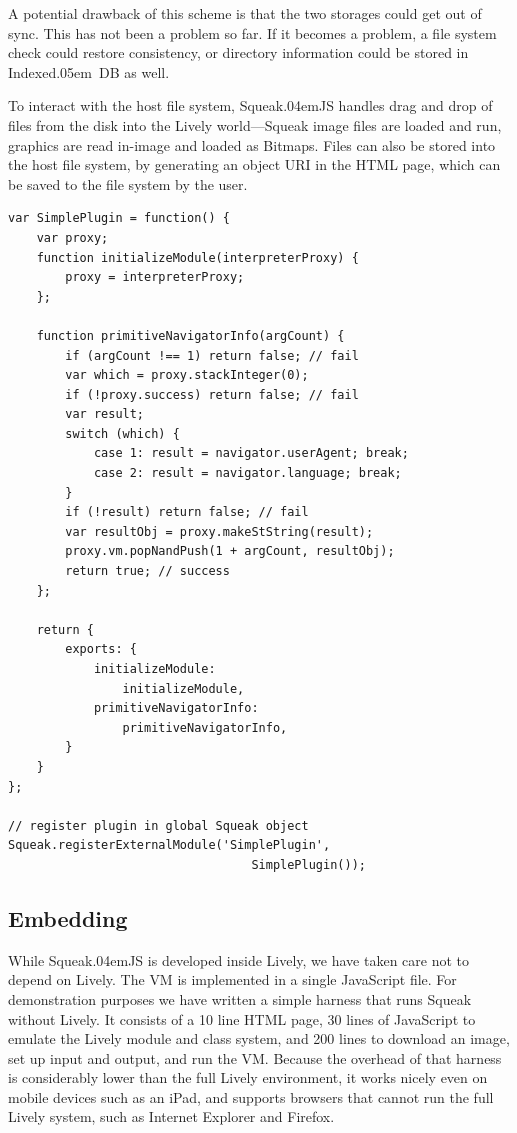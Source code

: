 \documentclass[natbib]{sigplanconf}
\newcommand*\SqueakJS{Squeak\texorpdfstring{\kern.04em}{}JS\xspace}
\newcommand*\JS{JavaScript\xspace}
\newcommand*\IndexedDB{\mbox{Indexed\kern.05em DB}\xspace}
\begin{document}
A potential drawback of this scheme is that the two storages could get
out of sync. This has not been a problem so far. If it becomes a
problem, a file system check could restore consistency, or directory
information could be stored in \IndexedDB as well.

To interact with the host file system, \SqueakJS handles drag and drop
of files from the disk into the Lively world---Squeak image files are
loaded and run, graphics are read in-image and loaded as Bitmaps.
Files can also be stored into the host file system, by generating an
object URI in the HTML page, which can be saved to the file system by
the user.


\begin{lstlisting}[float,caption={A simple Squeak Plugin},label=lst:simpleplugin]
var SimplePlugin = function() {
    var proxy;
    function initializeModule(interpreterProxy) {
        proxy = interpreterProxy;
    };

    function primitiveNavigatorInfo(argCount) {
        if (argCount !== 1) return false; // fail
        var which = proxy.stackInteger(0);
        if (!proxy.success) return false; // fail
        var result;
        switch (which) {
            case 1: result = navigator.userAgent; break;
            case 2: result = navigator.language; break;
        }
        if (!result) return false; // fail
        var resultObj = proxy.makeStString(result);
        proxy.vm.popNandPush(1 + argCount, resultObj);
        return true; // success
    };

    return {
        exports: {
            initializeModule:
                initializeModule,
            primitiveNavigatorInfo:
                primitiveNavigatorInfo,
        }
    }
};

// register plugin in global Squeak object
Squeak.registerExternalModule('SimplePlugin',
                                  SimplePlugin());

\end{lstlisting}

\subsection{Embedding}

While \SqueakJS is developed inside Lively, we have taken care not to
depend on Lively. The \ac{VM} is implemented in a single \JS file. For
demonstration purposes we have written a simple harness that runs
Squeak without Lively. It consists of a 10 line HTML page, 30 lines of
\JS to emulate the Lively module and class system, and 200
lines to download an image, set up input and output, and run the
\ac{VM}. Because the overhead of that harness is considerably lower than
the full Lively environment, it works nicely even on mobile devices
such as an iPad, and supports browsers that cannot run the full Lively
system, such as Internet Explorer and Firefox.
\end{document}

